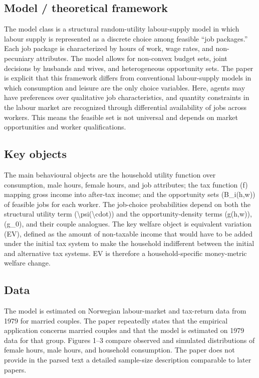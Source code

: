 \documentclass[11pt,a4paper]{article}
\begin{document}
\subsection*{Model / theoretical framework}
The model class is a structural random-utility labour-supply model in which labour supply is represented as a discrete choice among feasible “job packages.” Each job package is characterized by hours of work, wage rates, and non-pecuniary attributes. The model allows for non-convex budget sets, joint decisions by husbands and wives, and heterogeneous opportunity sets. The paper is explicit that this framework differs from conventional labour-supply models in which consumption and leisure are the only choice variables. Here, agents may have preferences over qualitative job characteristics, and quantity constraints in the labour market are recognized through differential availability of jobs across workers. This means the feasible set is not universal and depends on market opportunities and worker qualifications.

\subsection*{Key objects}
The main behavioural objects are the household utility function over consumption, male hours, female hours, and job attributes; the tax function (f) mapping gross income into after-tax income; and the opportunity sets (B\_i(h,w)) of feasible jobs for each worker. The job-choice probabilities depend on both the structural utility term (\textbackslash{}psi(\textbackslash{}cdot)) and the opportunity-density terms (g(h,w)), (g\_0), and their couple analogues. The key welfare object is equivalent variation (EV), defined as the amount of non-taxable income that would have to be added under the initial tax system to make the household indifferent between the initial and alternative tax systems. EV is therefore a household-specific money-metric welfare change.

\subsection*{Data}
The model is estimated on Norwegian labour-market and tax-return data from 1979 for married couples. The paper repeatedly states that the empirical application concerns married couples and that the model is estimated on 1979 data for that group. Figures 1–3 compare observed and simulated distributions of female hours, male hours, and household consumption. The paper does not provide in the parsed text a detailed sample-size description comparable to later papers.
\end{document}
